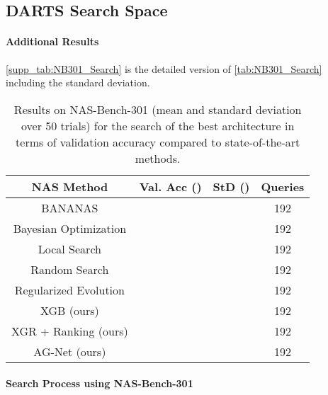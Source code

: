 \documentclass[runningheads]{llncs}
\begin{document}
\subsection{DARTS Search Space}\label{sec:supp_darts}
\paragraph{Additional Results}
\autoref{supp_tab:NB301_Search} is the detailed version of \autoref{tab:NB301_Search} including the standard deviation.
\begin{table}[ht]
	\caption{Results on NAS-Bench-301 (mean and standard deviation over 50 trials) for the search of the best architecture in terms of validation accuracy compared to state-of-the-art methods.}
	\label{supp_tab:NB301_Search}
	\scriptsize
	\begin{center}
		\begin{tabular}{c||c| c || c}
			\toprule
			\textbf{NAS Method}  & \textbf{Val. Acc} () & \textbf{StD} () & \textbf{Queries} \\
			\midrule
			BANANAS\textsuperscript{\textdagger} \cite{2021BANANAS} &   &   & 192 \\
			Bayesian Optimization\textsuperscript{\textdagger}  \cite{2015DNGO}  &  &  & 192  \\
			Local Search\textsuperscript{\textdagger} \cite{2020LocalSearchNAS} &  &  & 192\\
			Random Search\textsuperscript{\textdagger}\cite{2019RS}  &  &  & 192 \\
			Regularized Evolution\textsuperscript{{\textdagger}}\cite{2019EvolutionaryNAS}  &  &  & 192 \\
			\midrule
			XGB (ours) &  &  & 192 \\
			XGR + Ranking (ours) &  & & 192 \\
			\midrule
			AG-Net (ours)  &  &  & 192
			\\
			\bottomrule
		\end{tabular}
	\end{center}
\end{table}

\label{sec:darts}
\paragraph{Search Process using NAS-Bench-301}
\end{document}
